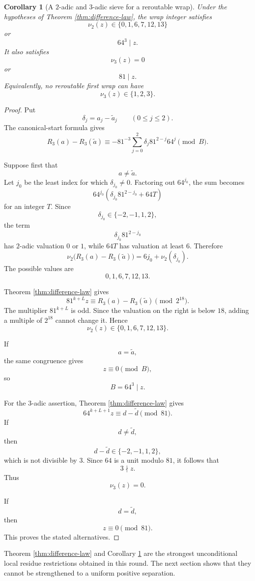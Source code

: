 \documentclass[11pt]{article}
\newtheorem{corollary}[theorem]{Corollary}
\theoremstyle{remark}
\begin{document}
\begin{corollary}[A \(2\)-adic and \(3\)-adic sieve for a reroutable wrap]
\label{cor:valuation-sieve}
Under the hypotheses of Theorem \ref{thm:difference-law}, the wrap integer satisfies
\[
\nu_2(z)\in\{0,1,6,7,12,13\}
\]
or
\[
64^3\mid z.
\]
It also satisfies
\[
\nu_3(z)=0
\]
or
\[
81\mid z.
\]
Equivalently, no reroutable first wrap can have
\[
\nu_3(z)\in\{1,2,3\}.
\]
\end{corollary}

\begin{proof}
Put
\[
\delta_j=a_j-\widetilde a_j
\qquad
(0\le j\le2).
\]
The canonical-start formula gives
\[
R_3(a)-R_3(\widetilde a)
\equiv
-81^{-3}
\sum_{j=0}^{2}
\delta_j81^{2-j}64^j
\pmod B.
\]

Suppose first that
\[
a\ne\widetilde a.
\]
Let \(j_0\) be the least index for which \(\delta_{j_0}\ne0\).  Factoring out \(64^{j_0}\), the sum becomes
\[
64^{j_0}
\left(
\delta_{j_0}81^{2-j_0}+64T
\right)
\]
for an integer \(T\).  Since
\[
\delta_{j_0}\in\{-2,-1,1,2\},
\]
the term
\[
\delta_{j_0}81^{2-j_0}
\]
has \(2\)-adic valuation \(0\) or \(1\), while \(64T\) has valuation at least \(6\).  Therefore
\[
\nu_2\bigl(R_3(a)-R_3(\widetilde a)\bigr)
=
6j_0+\nu_2(\delta_{j_0}).
\]
The possible values are
\[
0,1,6,7,12,13.
\]

Theorem \ref{thm:difference-law} gives
\[
81^{k+L}z
\equiv
R_3(a)-R_3(\widetilde a)
\pmod{2^{18}}.
\]
The multiplier \(81^{k+L}\) is odd.  Since the valuation on the right is below \(18\), adding a multiple of \(2^{18}\) cannot change it.  Hence
\[
\nu_2(z)\in\{0,1,6,7,12,13\}.
\]

If
\[
a=\widetilde a,
\]
the same congruence gives
\[
z\equiv0\pmod{B},
\]
so
\[
B=64^3\mid z.
\]

For the \(3\)-adic assertion, Theorem \ref{thm:difference-law} gives
\[
64^{k+L+1}z
\equiv
d-\widetilde d
\pmod{81}.
\]
If
\[
d\ne\widetilde d,
\]
then
\[
d-\widetilde d\in\{-2,-1,1,2\},
\]
which is not divisible by \(3\).  Since \(64\) is a unit modulo \(81\), it follows that
\[
3\nmid z.
\]
Thus
\[
\nu_3(z)=0.
\]

If
\[
d=\widetilde d,
\]
then
\[
z\equiv0\pmod{81}.
\]
This proves the stated alternatives.
\end{proof}

Theorem \ref{thm:difference-law} and Corollary \ref{cor:valuation-sieve} are the strongest unconditional local residue restrictions obtained in this round.  The next section shows that they cannot be strengthened to a uniform positive separation.
\end{document}
